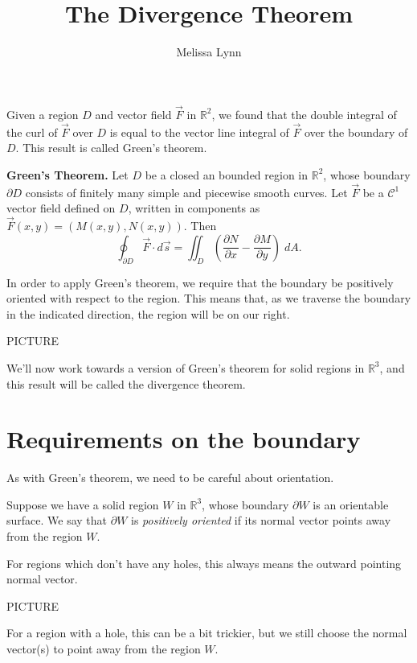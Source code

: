 \documentclass{ximera}
\title{The Divergence Theorem}
\author{Melissa Lynn}
\begin{document}
  
\begin{abstract}  
\end{abstract}  
\maketitle 

Given a region $D$ and vector field $\vec{F}$ in $\mathbb{R}^2$, we found that the double integral of the curl of $\vec{F}$ over $D$ is equal to the vector line integral of $\vec{F}$ over the boundary of $D$. This result is called Green's theorem.

\begin{theorem}
\textbf{Green's Theorem.} Let $D$ be a closed an bounded region in $\mathbb{R}^2$, whose boundary $\partial D$ consists of finitely many simple and piecewise smooth curves. Let $\vec{F}$ be a $\mathcal{C}^1$ vector field defined on $D$, written in components as $\vec{F}(x,y) = (M(x,y), N(x,y))$. Then
\[
\oint_{\partial D}\vec{F}\cdot d\vec{s} = \iint_D \left(\frac{\partial N}{\partial x} - \frac{\partial M}{\partial y}\right)\;dA.
\]
\end{theorem}

In order to apply Green's theorem, we require that the boundary be positively oriented with respect to the region. This means that, as we traverse the boundary in the indicated direction, the region will be on our right.

PICTURE

We'll now work towards a version of Green's theorem for solid regions in $\mathbb{R}^3$, and this result will be called the divergence theorem.

\section*{Requirements on the boundary}

As with Green's theorem, we need to be careful about orientation.

Suppose we have a solid region $W$ in $\mathbb{R}^3$, whose boundary $\partial W$ is an orientable surface. We say that $\partial W$ is \emph{positively oriented} if its normal vector points away from the region $W$.

For regions which don't have any holes, this always means the outward pointing normal vector.

PICTURE

For a region with a hole, this can be a bit trickier, but we still choose the normal vector(s) to point away from the region $W$.
\end{document}
